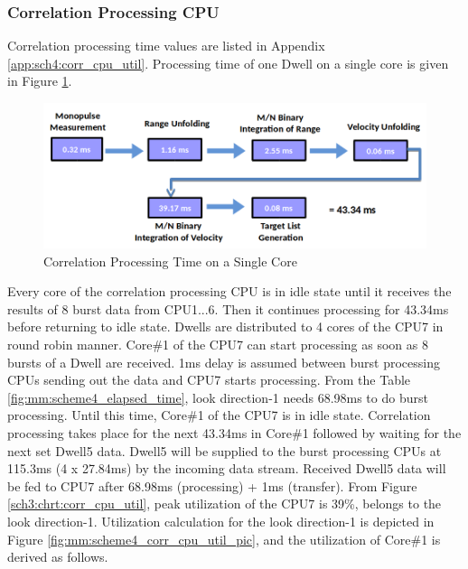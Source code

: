 \subsubsection{Correlation Processing CPU}
\label{mm:SSS:scheme4:corr_cpu_util}
Correlation processing time values are listed in Appendix \ref{app:sch4:corr_cpu_util}. Processing time of one Dwell on a single core is given in Figure \ref{fig:mm:scheme4_corr_components}.

\begin{figure}[h!]
	\centering
	\includegraphics[width=120mm]{figures/scheme4_corr_components}
	\caption{Correlation Processing Time on a Single Core}
	\label{fig:mm:scheme4_corr_components}
\end{figure}

Every core of the correlation processing CPU is in idle state until it receives the results of 8 burst data from CPU1...6. Then it continues processing for 43.34ms before returning to idle state. Dwells are distributed to 4 cores of the CPU7 in round robin manner. Core\#1 of the CPU7 can start processing as soon as 8 bursts of a Dwell are received. 1ms delay is assumed between burst processing CPUs sending out the data and CPU7 starts processing. From the Table \ref{fig:mm:scheme4_elapsed_time}, look direction-1 needs 68.98ms to do burst processing. Until this time, Core\#1 of the CPU7 is in idle state. Correlation processing takes place for the next 43.34ms in Core\#1 followed by waiting for the next set Dwell5 data. Dwell5 will be supplied to the burst processing CPUs at 115.3ms (4 x 27.84ms) by the incoming data stream. Received Dwell5 data will be fed to CPU7 after 68.98ms (processing) + 1ms (transfer). From Figure \ref{sch3:chrt:corr_cpu_util}, peak utilization of the CPU7 is 39\%, belongs to the look direction-1. Utilization calculation for the look direction-1 is depicted in Figure \ref{fig:mm:scheme4_corr_cpu_util_pic}, and the utilization of Core\#1 is derived as follows.

